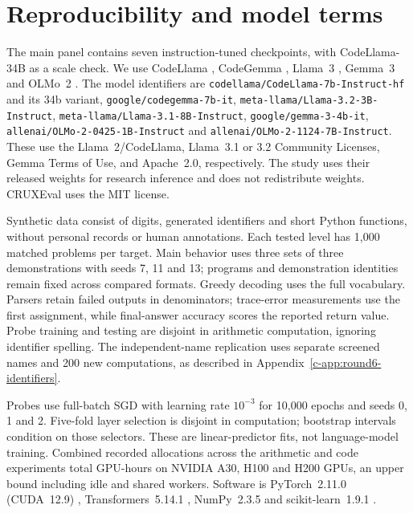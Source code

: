 \section{Reproducibility and model terms}
\label{c-app:reproducibility}

The main panel contains seven instruction-tuned checkpoints, with CodeLlama-34B as a
scale check. We use CodeLlama \citep{roziere2023codellama}, CodeGemma
\citep{codegemmateam2024codegemma}, Llama~3 \citep{grattafiori2024llama3}, Gemma~3
\citep{gemmateam2025gemma3} and OLMo~2 \citep{olmo2024olmo2,walsh2025olmo2}.
The model identifiers are \texttt{codellama/CodeLlama-7b-Instruct-hf} and its 34b variant,
\texttt{google/codegemma-7b-it}, \texttt{meta-llama/Llama-3.2-3B-Instruct},
\texttt{meta-llama/Llama-3.1-8B-Instruct}, \texttt{google/gemma-3-4b-it},
\texttt{allenai/OLMo-2-0425-1B-Instruct} and \texttt{allenai/OLMo-2-1124-7B-Instruct}.
These use the Llama~2/CodeLlama, Llama~3.1 or 3.2 Community Licenses, Gemma Terms of Use,
and Apache~2.0, respectively. The study uses their released weights for research inference
and does not redistribute weights. CRUXEval uses the MIT license.

Synthetic data consist of digits, generated identifiers and short Python functions,
without personal records or human annotations. Each tested level has 1,000 matched
problems per target. Main behavior uses three sets of three demonstrations with seeds
7, 11 and 13; programs and demonstration identities remain fixed across compared formats.
Greedy decoding uses the full vocabulary. Parsers retain failed outputs in denominators;
trace-error measurements use the first assignment, while final-answer accuracy scores
the reported return value. Probe training and testing are disjoint in arithmetic computation,
ignoring identifier spelling. The independent-name replication uses separate screened
names and 200 new computations, as described in Appendix~\ref{c-app:round6-identifiers}.

Probes use full-batch SGD with learning rate $10^{-3}$ for 10,000 epochs and seeds 0, 1 and 2.
Five-fold layer selection is disjoint in computation; bootstrap intervals condition on
those selectors. These are linear-predictor fits, not language-model training.
Combined recorded allocations across the arithmetic and code experiments total
 GPU-hours on NVIDIA A30, H100 and H200 GPUs, an upper bound
including idle and shared workers. Software is PyTorch~2.11.0 (CUDA~12.9)
\citep{paszke2019pytorch}, Transformers~5.14.1 \citep{wolf2020transformers},
NumPy~2.3.5 and scikit-learn~1.9.1 \citep{pedregosa2011sklearn}.
